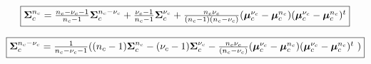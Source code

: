 \documentclass[a4paper]{article}
\begin{document}
        \begin{equation}
            \fbox{$\boldsymbol{\Sigma}_c^{n_c} = \frac{n_c-\nu_c-1}{n_c-1} \boldsymbol{\Sigma}_c^{n_c-\nu_c} + \frac{\nu_c-1}{n_c-1} \boldsymbol{\Sigma}_c^{\nu_c} + \frac{n_c \nu_c}{(n_c-1)(n_c-\nu_c)} (\boldsymbol{\mu}_c^{\nu_c}-\boldsymbol{\mu}_c^{n_c})(\boldsymbol{\mu}_c^{\nu_c}-\boldsymbol{\mu}_c^{n_c})^t$}
        \end{equation}

        \begin{equation}
            \fbox{$\boldsymbol{\Sigma}_c^{n_c-\nu_c} = \frac{1}{n_c-\nu_c-1} ( (n_c-1) \boldsymbol{\Sigma}_c^{n_c} - (\nu_c-1) \boldsymbol{\Sigma}_c^{\nu_c} - \frac{n_c \nu_c}{(n_c-\nu_c)} (\boldsymbol{\mu}_c^{\nu_c}-\boldsymbol{\mu}_c^{n_c})(\boldsymbol{\mu}_c^{\nu_c}-\boldsymbol{\mu}_c^{n_c})^t$ )}
        \end{equation}




\end{document}
